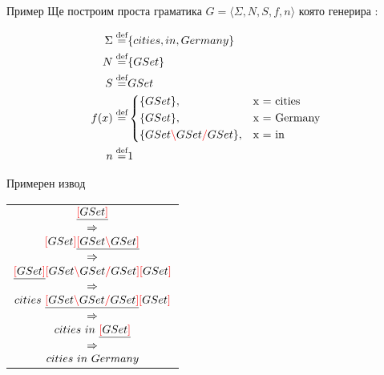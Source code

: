 \documentclass[9pt]{beamer}
\begin{document}
  \begin{frame}{Пример}
    Ще построим проста граматика $G = \langle \Sigma, N, S, f, n \rangle$
    която генерира :

    \begin{align*}
        \Sigma \defeq& \{ cities, in, Germany \} \\
        N \defeq& \{ GSet \} \\
        S \defeq& GSet \\
        f(x) \defeq&
            \begin{cases*}
                \{ GSet \},& x = cities \\
                \{ GSet \},& x = Germany \\
                \{ GSet \lc GSet \rc GSet \},& x = in \\
            \end{cases*} \\
        n \defeq& 1 \\
    \end{align*}
  \end{frame}

  \begin{frame}{Примерен извод}
    \begin{center}
        \begin{tabular}{c}
            $\underline{\textcolor{red}{[} GSet \textcolor{red}{]}}$ \\ $\Rightarrow$ \\
            $\textcolor{red}{[} GSet \textcolor{red}{]} \underline{\textcolor{red}{[} GSet \textcolor{red}{\backslash} GSet \textcolor{red}{]}}$ \\ $\Rightarrow$ \\
            $\underline{\textcolor{red}{[} GSet \textcolor{red}{]}} \textcolor{red}{[} GSet \textcolor{red}{\backslash} GSet \textcolor{red}{/} GSet \textcolor{red}{]} \textcolor{red}{[} GSet \textcolor{red}{]}$ \\ $\Rightarrow$ \\
            $cities \text{ } \underline{\textcolor{red}{[} GSet \textcolor{red}{\backslash} GSet \textcolor{red}{/} GSet \textcolor{red}{]}} \textcolor{red}{[} GSet \textcolor{red}{]}$ \\ $\Rightarrow$ \\
            $cities \text{ } in \text{ } \underline{\textcolor{red}{[} GSet \textcolor{red}{]}}$ \\ $\Rightarrow$ \\
            $cities \text{ } in \text{ } Germany$ \\
        \end{tabular}
    \end{center}
  \end{frame}
\end{document}
